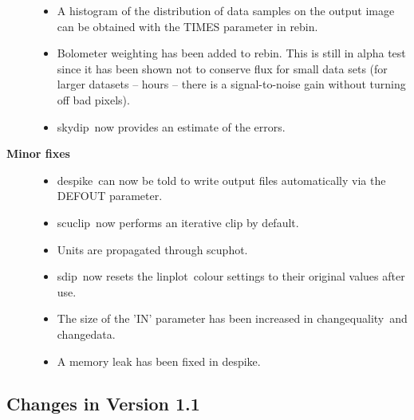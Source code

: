 \documentclass[twoside,11pt]{article}
\newcommand{\task}[1]{{\sf #1}}
\newcommand{\rebin}{\htmlref{\task{rebin}}{REBIN}}
\newcommand{\chgqual}{\htmlref{\task{change\_quality}}{CHANGE_QUALITY}}
\newcommand{\chgdata}{\htmlref{\task{change\_data}}{CHANGE_DATA}}
\newcommand{\skydip}{\htmlref{\task{skydip}}{SKYDIP}}
\newcommand{\scuphot}{\htmlref{\task{scuphot}}{SCUPHOT}}
\newcommand{\sdip}{\htmlref{\task{sdip}}{SDIP}}
\newcommand{\despike}{\htmlref{\task{despike}}{DESPIKE}}
\newcommand{\scuclip}{\htmlref{\task{scuclip}}{SCUCLIP}}
\newcommand{\linplot}{\xref{\task{linplot}}{sun95}{LINPLOT}}
\newcommand{\htmlref}[2]{#1}
\newcommand{\xref}[3]{#1}
\renewcommand{\_}{\texttt{\symbol{95}}}
\begin{document}
\begin{description}
\begin{itemize}
\item A histogram of the distribution of data samples on the output image
      can be obtained with the TIMES parameter in \rebin.

\item Bolometer weighting has been added to \rebin. This is still in alpha
   test since it has been shown not to conserve flux for small data
   sets (for larger datasets -- hours -- there is a signal-to-noise
   gain without turning off bad pixels).

\item \skydip\ now provides an estimate of the errors.

\end{itemize}

\item[\textbf{Minor fixes}] \mbox{}

\begin{itemize}

\item \despike\ can now be told to write output files automatically via the
  DEFOUT parameter.

\item \scuclip\ now performs an iterative clip by default.

\item Units are propagated through \scuphot.

\item \sdip\ now resets the \linplot\ colour settings to their original values
  after use.

\item The size of the 'IN' parameter has been increased in \chgqual\ and
  \chgdata.

\item A memory leak has been fixed in \despike.


\end{itemize}

\end{description}


\subsection{Changes in Version 1.1}
\end{document}
